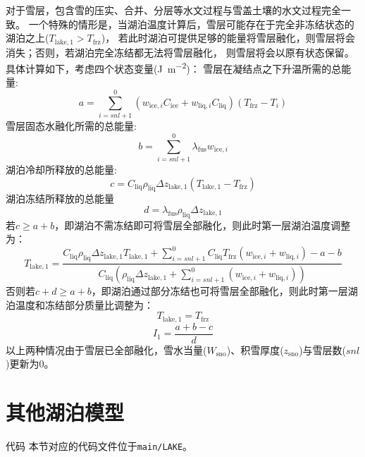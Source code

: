 对于雪层，包含雪的压实、合并、分层等水文过程与雪盖土壤的水文过程完全一致。
一个特殊的情形是，当湖泊温度计算后，雪层可能存在于完全非冻结状态的湖泊之上($T_{\mathrm{lake,1}}>T_{\mathrm {frz}} $)，
若此时湖泊可提供足够的能量将雪层融化，则雪层将会消失；否则，若湖泊完全冻结都无法将雪层融化，
则雪层将会以原有状态保留。具体计算如下，考虑四个状态变量(\unit{J.m^{-2}})：
雪层在凝结点之下升温所需的总能量:
\begin{equation}
  a=\sum_{i=s n l+1}^{0}\left(w_{\mathrm{ice},i} C_{\mathrm{ice}}+w_{\mathrm{liq},i} C_{\mathrm{liq}}\right)\left(T_{\mathrm {frz}}-T_{i}\right)
\end{equation}
雪层固态水融化所需的总能量:
\begin{equation}
  b=\sum_{i=s n l+1}^{0} \lambda_{\mathrm {fus}} w_{\mathrm{ice},i}
\end{equation}
湖泊冷却所释放的总能量:
\begin{equation}
  c=C_{\mathrm{liq}} \rho_{\mathrm{liq}} \Delta z_{\mathrm{lake, 1}}\left(T_{\mathrm{lake, 1}}-T_{\mathrm {frz}}\right)
\end{equation}
湖泊冻结所释放的总能量
\begin{equation}
  d=\lambda_{\mathrm {fus}} \rho_{\mathrm{liq}} \Delta z_{\mathrm{lake, 1}}
\end{equation}
若$c\geqslant a+b$，即湖泊不需冻结即可将雪层全部融化，则此时第一层湖泊温度调整为：
\begin{equation}
  T_{\mathrm{lake, 1}}=\frac{C_{\mathrm{liq}} \rho_{\mathrm{liq}} \Delta z_{\mathrm{lake, 1}} T_{\mathrm{lake, 1}}+\sum_{i=s n l+1}^{0} C_{\mathrm{liq}}
  T_{\mathrm {frz}}\left(w_{\mathrm{ice},i}+w_{\mathrm{liq},i}\right)-a-b}{C_{\mathrm{liq}}\left(\rho_{\mathrm{liq}} \Delta z_{\mathrm{lake, 1}}+\sum_{i=s n l+1}^{0}
  \left(w_{\mathrm{ice},i}+w_{\mathrm{liq},i}\right)\right)}
\end{equation}
否则若$c+d\geqslant a+b$，即湖泊通过部分冻结也可将雪层全部融化，则此时第一层湖泊温度和冻结部分质量比调整为：
\begin{equation}
  T_{\mathrm{lake, 1}}=T_{\mathrm {frz}}
\end{equation}
\begin{equation}
  I_{1}=\frac{a+b-c}{d}
\end{equation}
以上两种情况由于雪层已全部融化，雪水当量($W_{\mathrm{sno}}$)、积雪厚度($z_{\mathrm{sno}}$)与雪层数($snl$)更新为0。
%
\section{其他湖泊模型}\label{其他湖泊模型}
\begin{mymdframed}{代码}
  本节对应的代码文件位于\texttt{main/LAKE}。
\end{mymdframed}

